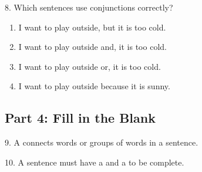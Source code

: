 \documentclass[12pt]{article}
\begin{document}
8. Which sentences use conjunctions correctly?\\
\begin{enumerate}[label=\Alph*.]
    \item I want to play outside, but it is too cold.  
    \item I want to play outside and, it is too cold.  
    \item I want to play outside or, it is too cold.  
    \item I want to play outside because it is sunny.  
\end{enumerate}

\vspace{1cm}

\subsection*{Part 4: Fill in the Blank}

9. A \underline{\hspace{4cm}} connects words or groups of words in a sentence.

\vspace{3cm}

10. A sentence must have a \underline{\hspace{4cm}} and a \underline{\hspace{4cm}} to be complete.









\end{document}

